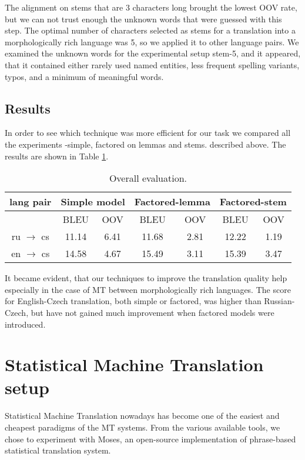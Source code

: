 \documentclass[11pt,letterpaper]{article}
\begin{document}
The alignment on stems that are 3 characters long brought the lowest OOV rate,
but we can not trust enough the unknown words that were guessed with this step.
The optimal number of characters selected as stems for a translation into a morphologically rich 
language was 5, so we applied it to other language pairs.
We examined the unknown words for the experimental setup stem-5, and it appeared, that it contained either 
rarely used named entities, less frequent spelling variants, typos, and a minimum of meaningful words. 


\subsection{Results}

In order to see which technique was more efficient for our 
task we compared all the experiments -simple, factored on lemmas and stems. 
described above. The results are shown in Table \ref{tab:overall}.
\begin{table}
\begin{center}
\begin{tabular} {ccccccc}
\hline
lang pair &\multicolumn{2}{c}{Simple model} & \multicolumn{2}{c}{Factored-lemma} & \multicolumn{2}{c}{Factored-stem}\\ \hline
                       & BLEU   &OOV    & BLEU   & OOV & BLEU  & OOV \\ \hline
ru $\rightarrow$ cs    & 11.14  &6.41   &11.68   &2.81 & 12.22 &1.19 \\ %
en $\rightarrow$ cs    & 14.58  &4.67   &15.49   &3.11 & 15.39  &3.47  \\ \hline %
\end{tabular}
\end{center}
\caption{Overall evaluation.}
\label{tab:overall}
\end{table}

It became evident, that our techniques to improve the translation quality help especially in the
case of MT between morphologically rich languages. The score for English-Czech translation, both simple
or factored, was higher than Russian-Czech, but have not gained much improvement when 
factored models were introduced. 

\section{Statistical Machine Translation setup}
Statistical Machine Translation nowadays has become one of the easiest and cheapest paradigms of the MT systems. 
From the various available tools, we chose to experiment with Moses, an open-source implementation of phrase-based statistical translation system.
\end{document}
